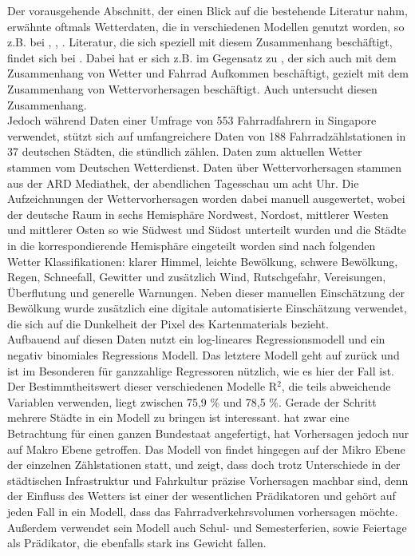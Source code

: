 \documentclass[a4paper,12pt]{thesis}
\begin{document}
Der vorausgehende Abschnitt, der einen Blick auf die bestehende Literatur nahm, erwähnte oftmals Wetterdaten, die in verschiedenen Modellen genutzt worden, so z.B. bei \cite{Holmgren2017}, \cite{Broucke2019}, \cite{Li2015}. Literatur, die sich speziell mit diesem Zusammenhang beschäftigt, findet sich bei \cite{Wessel2020}. Dabei hat er sich z.B. im Gegensatz zu \cite{Nankervis1999}, der sich auch mit dem Zusammenhang von Wetter und Fahrrad Aufkommen beschäftigt, gezielt mit dem Zusammenhang von Wettervorhersagen beschäftigt. Auch \cite{Meng2016} untersucht diesen Zusammenhang.\\
Jedoch während \cite{Meng2016} Daten einer Umfrage von 553 Fahrradfahrern in Singapore verwendet, stützt sich \cite{Wessel2020} auf umfangreichere Daten von 188 Fahrradzählstationen in 37 deutschen Städten, die stündlich zählen. Daten zum aktuellen Wetter stammen vom Deutschen Wetterdienst. Daten über Wettervorhersagen stammen aus der ARD Mediathek, der abendlichen Tagesschau um acht Uhr. Die Aufzeichnungen der Wettervorhersagen worden dabei manuell ausgewertet, wobei der deutsche Raum in sechs Hemisphäre Nordwest, Nordost, mittlerer Westen und mittlerer Osten so wie Südwest und Südost unterteilt wurden und die Städte in die korrespondierende Hemisphäre eingeteilt worden sind nach folgenden Wetter Klassifikationen: klarer Himmel, leichte Bewölkung, schwere Bewölkung, Regen, Schneefall, Gewitter und zusätzlich Wind, Rutschgefahr, Vereisungen, Überflutung und generelle Warnungen. Neben dieser manuellen Einschätzung der Bewölkung wurde zusätzlich eine digitale automatisierte Einschätzung verwendet, die sich auf die Dunkelheit der Pixel des Kartenmaterials bezieht.\\
Aufbauend auf diesen Daten nutzt \cite{Wessel2020} ein log-lineares Regressionsmodell und ein negativ binomiales Regressions Modell. Das letztere Modell geht auf \cite{Hausman1984} zurück und ist im Besonderen für ganzzahlige Regressoren nützlich, wie es hier der Fall ist. Der Bestimmtheitswert dieser verschiedenen Modelle R$^2$, die teils abweichende Variablen verwenden, liegt zwischen 75,9 \% und 78,5 \%. Gerade der Schritt mehrere Städte in ein Modell zu bringen ist interessant. \cite{Saha2018} hat zwar eine Betrachtung für einen ganzen Bundestaat angefertigt, hat Vorhersagen jedoch nur auf Makro Ebene getroffen. Das Modell von \cite{Wessel2020} findet hingegen auf der Mikro Ebene der einzelnen Zählstationen statt, und zeigt, dass doch trotz Unterschiede in der städtischen Infrastruktur und Fahrkultur präzise Vorhersagen machbar sind, denn der Einfluss des Wetters ist einer der wesentlichen Prädikatoren und gehört auf jeden Fall in ein Modell, dass das Fahrradverkehrsvolumen vorhersagen möchte. Außerdem verwendet sein Modell auch Schul- und Semesterferien, sowie Feiertage als Prädikator, die ebenfalls stark ins Gewicht fallen.\\
\end{document}
